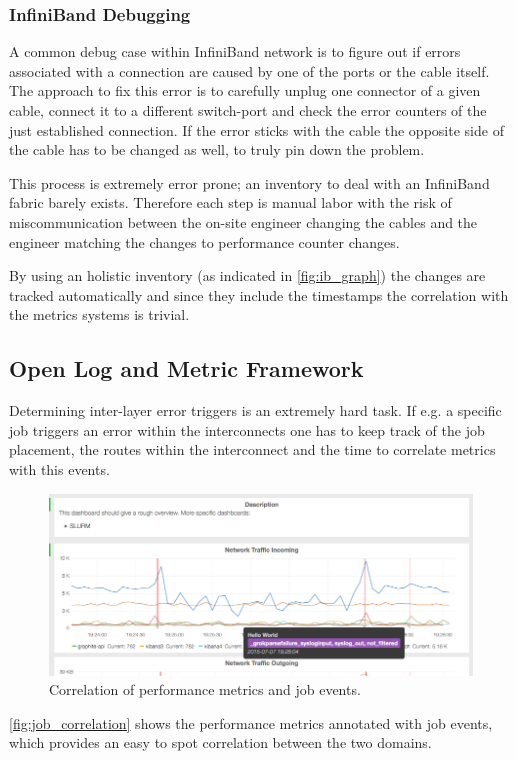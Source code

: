 \subsubsection{InfiniBand Debugging}
A common debug case within InfiniBand network is to figure out if errors associated with a connection are caused by one of the ports or the cable itself.
The approach to fix this error is to carefully unplug one connector of a given cable, connect it to a different switch-port and check the error counters of the just established connection.
If the error sticks with the cable the opposite side of the cable has to be changed as well, to truly pin down the problem.

This process is extremely error prone; an inventory to deal with an InfiniBand fabric barely exists. Therefore each step is manual labor with the risk of miscommunication between the on-site engineer changing the
cables and the engineer matching the changes to performance counter changes.

By using an holistic inventory (as indicated in \autoref{fig:ib_graph}) the changes are tracked automatically and since they include the timestamps the correlation with the metrics systems is trivial.

\subsection{Open Log and Metric Framework}
Determining inter-layer error triggers is an extremely hard task. If e.g. a specific job triggers an error within the interconnects one has to keep track of the job placement, the routes within the interconnect and
the time to correlate metrics with this events.

\begin{figure}[!ht]
    \includegraphics[width=.4\textwidth]{images/png/mon_cor.png}
    \caption{\label{fig:job_correlation}Correlation of performance metrics and job events.}
\end{figure}
\autoref{fig:job_correlation} shows the performance metrics annotated with job events, which provides an easy to spot correlation between the two domains.

